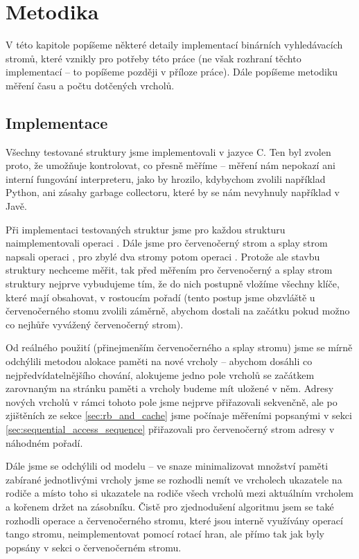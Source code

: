\chapter{Metodika}

V této kapitole popíšeme některé detaily implementací binárních vyhledávacích stromů, které vznikly pro potřeby této práce (ne však rozhraní těchto implementací -- to popíšeme později v příloze práce). Dále popíšeme metodiku měření času a počtu dotčených vrcholů.

\section{Implementace}

Všechny testované struktury jsme implementovali v jazyce C. Ten byl zvolen
proto, že umožňuje kontrolovat, co přesně měříme -- měření nám nepokazí ani
interní fungování interpreteru, jako by hrozilo, kdybychom zvolili například
Python, ani zásahy garbage collectoru, které by se nám nevyhnuly například v
Javě.

Při implementaci testovaných struktur jsme pro každou strukturu
naimplementovali operaci . Dále jsme pro červenočerný strom a splay
strom napsali operaci , pro zbylé dva stromy potom operaci
. Protože ale stavbu struktury nechceme měřit, tak před měřením pro
červenočerný a splay strom struktury nejprve vybudujeme tím, že do nich
postupně vložíme všechny klíče, které mají obsahovat, v rostoucím pořadí (tento postup jsme obzvláště u červenočerného stomu zvolili záměrně, abychom dostali na začátku pokud možno co nejhůře vyvážený červenočerný strom). 

Od reálného použití (přinejmenším červenočerného a splay stromu) jsme se mírně odchýlili metodou alokace paměti na nové vrcholy -- abychom dosáhli co nejpředvídatelnějšího chování, alokujeme jedno pole vrcholů se začátkem zarovnaným na stránku paměti a vrcholy budeme mít uložené v něm. Adresy nových vrcholů v rámci tohoto pole jsme nejprve přiřazovali sekvenčně, ale po zjištěních ze sekce \ref{sec:rb_and_cache} jsme počínaje měřeními popsanými v sekci \ref{sec:sequential_access_sequence} přiřazovali pro červenočerný strom adresy v náhodném pořadí. 

Dále jsme se odchýlili od modelu -- ve snaze minimalizovat množství paměti zabírané jednotlivými vrcholy jsme se rozhodli nemít ve vrcholech ukazatele na rodiče a místo toho si ukazatele na rodiče všech vrcholů mezi aktuálním vrcholem a kořenem držet na zásobníku. Čistě pro zjednodušení algoritmu jsem se také rozhodli operace  a  červenočerného stromu, které jsou interně využívány operací  tango stromu, neimplementovat pomocí rotací hran, ale přímo tak jak byly popsány v sekci o červenočerném stromu. 

